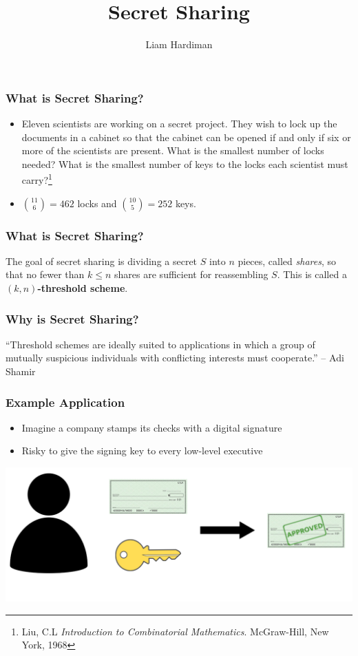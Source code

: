 \documentclass{beamer}
\title{Secret Sharing}
\author{Liam Hardiman}
\begin{document}
\maketitle

\begin{frame}
	\frametitle{What is Secret Sharing?}
	\begin{itemize}
		\item Eleven scientists are working on a secret project. They wish to lock up the documents in a cabinet so that the cabinet can be opened if and only if six or more of the scientists are present. What is the smallest number of locks needed? What is the smallest number of keys to the locks each scientist must carry?\footnote{Liu, C.L \textit{Introduction to Combinatorial Mathematics}. McGraw-Hill, New York, 1968}\\\pause

		\item $\binom{11}{6} = 462$ locks and $\binom{10}{5} = 252$ keys.
	\end{itemize}
\end{frame}

\begin{frame}
	\frametitle{What is Secret Sharing?}

	The goal of secret sharing is dividing a secret $S$ into $n$ pieces, called \textit{shares}, so that no fewer than $k\leq n$ shares are sufficient for reassembling $S$. This is called a $(k,n)$\textbf{-threshold scheme}.
\end{frame}

\begin{frame}
	\frametitle{Why is Secret Sharing?}
	``Threshold schemes are ideally suited to applications in which a group of mutually suspicious individuals with conflicting interests must cooperate.'' -- Adi Shamir
\end{frame}

\begin{frame}
	\frametitle{Example Application}
	\begin{itemize}
		\item Imagine a company stamps its checks with a digital signature\pause
		\item Risky to give the signing key to every low-level executive\pause
	\end{itemize}
	\vspace{1cm}
	\centering
	\includegraphics[scale=.8]{one_exec.png}
\end{frame}
\end{document}
